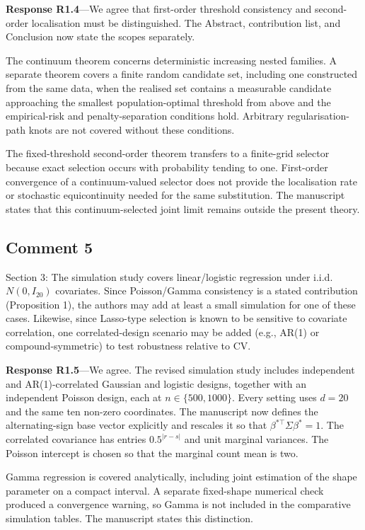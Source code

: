 \documentclass[11pt]{article}
\newcommand{\response}[1]{\par\noindent\textbf{Response #1}---}
\begin{document}
\response{R1.4}We agree that first-order threshold consistency and second-order localisation must be distinguished. The Abstract, contribution list, and Conclusion now state the scopes separately.

The continuum theorem concerns deterministic increasing nested families. A separate theorem covers a finite random candidate set, including one constructed from the same data, when the realised set contains a measurable candidate approaching the smallest population-optimal threshold from above and the empirical-risk and penalty-separation conditions hold. Arbitrary regularisation-path knots are not covered without these conditions.

The fixed-threshold second-order theorem transfers to a finite-grid selector because exact selection occurs with probability tending to one. First-order convergence of a continuum-valued selector does not provide the localisation rate or stochastic equicontinuity needed for the same substitution. The manuscript states that this continuum-selected joint limit remains outside the present theory.

\subsection*{Comment 5}
Section 3: The simulation study covers linear/logistic regression under i.i.d. $N(0,I_{20})$ covariates. Since Poisson/Gamma consistency is a stated contribution (Proposition 1), the authors may add at least a small simulation for one of these cases. Likewise, since Lasso-type selection is known to be sensitive to covariate correlation, one correlated-design scenario may be added (e.g., AR(1) or compound-symmetric) to test robustness relative to CV.

\response{R1.5}We agree. The revised simulation study includes independent and AR(1)-correlated Gaussian and logistic designs, together with an independent Poisson design, each at $n\in\{500,1000\}$. Every setting uses $d=20$ and the same ten non-zero coordinates. The manuscript now defines the alternating-sign base vector explicitly and rescales it so that $\beta^{*\top}\Sigma\beta^*=1$. The correlated covariance has entries $0.5^{|r-s|}$ and unit marginal variances. The Poisson intercept is chosen so that the marginal count mean is two.

Gamma regression is covered analytically, including joint estimation of the shape parameter on a compact interval. A separate fixed-shape numerical check produced a convergence warning, so Gamma is not included in the comparative simulation tables. The manuscript states this distinction.
\end{document}
